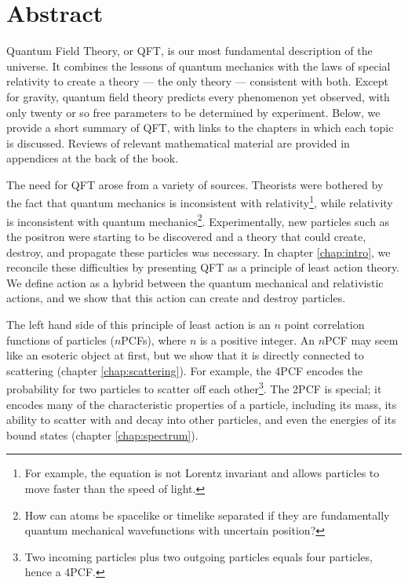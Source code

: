 \chapter{Abstract}

Quantum Field Theory, or QFT, is our most fundamental description of the universe. It combines the lessons of quantum mechanics with the laws of special relativity to create a theory --- the only theory --- consistent with both. Except for gravity, quantum field theory predicts every phenomenon yet observed, with only twenty or so free parameters to be determined by experiment. Below, we provide a short summary of QFT, with links to the chapters in which each topic is discussed. Reviews of relevant mathematical material are provided in appendices at the back of the book.

The need for QFT arose from a variety of sources. Theorists were bothered by the fact that quantum mechanics is inconsistent with relativity\footnote{For example, the \Schrodinger equation is not Lorentz invariant and allows particles to move faster than the speed of light.}, while relativity is inconsistent with quantum mechanics\footnote{How can atoms be spacelike or timelike separated if they are fundamentally quantum mechanical wavefunctions with uncertain position?}. Experimentally, new particles such as the positron were starting to be discovered and a theory that could create, destroy, and propagate these particles was necessary. In chapter \ref{chap:intro}, we reconcile these difficulties by presenting QFT as a principle of least action theory. We define action as a hybrid between the quantum mechanical and relativistic actions, and we show that this action can create and destroy particles.

The left hand side of this principle of least action is an $n$ point correlation functions of particles ($n$PCFs), where $n$ is a positive integer. An $n$PCF may seem like an esoteric object at first, but we show that it is directly connected to scattering (chapter \ref{chap:scattering}). For example, the 4PCF encodes the probability for two particles to scatter off each other\footnote{Two incoming particles plus two outgoing particles equals four particles, hence a 4PCF.}. The 2PCF is special; it encodes many of the characteristic properties of a particle, including its mass, its ability to scatter with and decay into other particles, and even the energies of its bound states (chapter \ref{chap:spectrum}).


